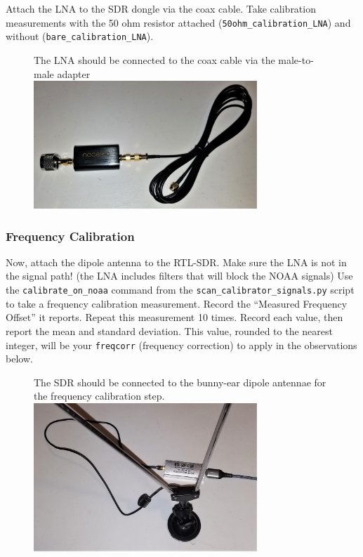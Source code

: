 \documentclass[11pt]{article}
\begin{document}
Attach the LNA to the SDR dongle via the coax cable.  Take calibration
measurements with the 50 ohm resistor attached (\verb|50ohm_calibration_LNA|)
and without (\verb|bare_calibration_LNA|).


\begin{figure}[htp]
    \centering
    The LNA should be connected to the coax cable via the male-to-male adapter\\
\includegraphics[width=0.75\textwidth]{RadioLabPhotos/coaxcable_to_LNA.jpg}
\end{figure}

\subsubsection{Frequency Calibration}
\label{sec:freqcal}
Now, attach the dipole antenna to the RTL-SDR.
Make sure the LNA is not in the signal path!  (the LNA includes filters that will block the NOAA signals)
Use the \verb|calibrate_on_noaa| command from the \verb|scan_calibrator_signals.py|
script to take a frequency calibration measurement.
Record the ``Measured Frequency Offset'' it reports.
Repeat this measurement 10 times.
Record each value, then report the mean and standard deviation.
This value, rounded to the nearest integer, will be your \verb|freqcorr| (frequency correction)
to apply in the observations below.

\begin{figure}[htp]
    \centering
    The SDR should be connected to the bunny-ear dipole antennae for the frequency calibration step.\\
\includegraphics[width=0.75\textwidth]{RadioLabPhotos/sdr_to_bunnyears.jpg}
\end{figure}
\end{document}
